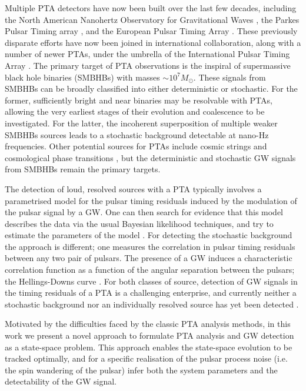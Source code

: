 \documentclass[fleqn,usenatbib,useAMS]{mnras}
\begin{document}
\noindent Multiple PTA detectors have now been built over the last few decades, including the North American Nanohertz Observatory for Gravitational Waves \citep[NANOGrav,][]{2020ApJ...905L..34A}, the Parkes Pulsar Timing array \citep[PPTA][]{2020PASA...37...20K}, and the European Pulsar Timing Array \citep[EPTA,][]{2010CQGra..27h4014F}. These previously disparate efforts have now been joined in international collaboration, along with a number of newer PTAs, under the umbrella of the International Pulsar Timing Array \citep[IPTA][]{2019MNRAS.490.4666P}. The primary target of PTA observations is the inspiral of supermassive black hole binaries (SMBHBs) with masses $\sim 10^7 M_{\odot}$. These signals from SMBHBs can be broadly classified into either deterministic or stochastic. For the former, sufficiently bright and near binaries may be resolvable with PTAs, allowing the very earliest stages of their evolution and coalescence to be investigated. For the latter, the  incoherent superposition of multiple weaker SMBHBs sources leads to a stochastic background detectable at nano-Hz frequencies. Other potential sources for PTAs include cosmic strings \citep[e.g.][]{PTAstring} and cosmological phase transitions \citep[e.g.][]{PTAphase}, but the deterministic and stochastic GW signals from SMBHBs remain the primary targets. \newline 



\noindent The detection of loud, resolved sources with a PTA typically involves a parametrised model for the pulsar timing residuals induced by the modulation of the pulsar signal by a GW. One can then search for evidence that this model describes the data via the usual Bayesian likelihood techniques, and try to estimate the parameters of the model \citep[e.g.][]{Babak2016}. For detecting the stochastic background the approach is different; one measures the correlation in pulsar timing residuals between any two pair of pulsars. The presence of a GW induces a characteristic correlation function as a function of the angular separation between the pulsars; the Hellings-Downs curve \citep{Hellings}. For both classes of source, detection of GW signals in the timing residuals of a PTA is a challenging enterprise, and currently neither a stochastic background nor an individually resolved source has yet been detected \citep{2022MNRAS.510.4873A, 10.1093/nsr/nwx126}. \newline 



\noindent Motivated by the difficulties faced by the classic PTA analysis methods, in this work we present a novel approach to formulate PTA analysis and GW detection as a state-space problem. This approach enables the state-space evolution to be tracked optimally, and for a specific realisation of the pulsar process noise (i.e. the spin wandering of the pulsar) infer both the system parameters and the detectability of the GW signal. 
 
\end{document}
